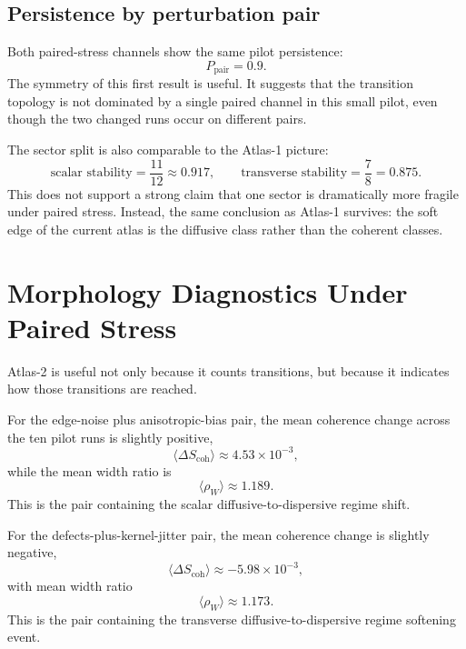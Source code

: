 \documentclass[11pt]{article}
\begin{document}
\subsection{Persistence by perturbation pair}
Both paired-stress channels show the same pilot persistence:
\begin{equation}
P_{\mathrm{pair}} = 0.9.
\end{equation}
The symmetry of this first result is useful. It suggests that the transition topology is not dominated by a single paired channel in this small pilot, even though the two changed runs occur on different pairs.

The sector split is also comparable to the Atlas-1 picture:
\begin{equation}
\text{scalar stability} = \frac{11}{12} \approx 0.917,
\qquad
\text{transverse stability} = \frac{7}{8} = 0.875.
\end{equation}
This does not support a strong claim that one sector is dramatically more fragile under paired stress. Instead, the same conclusion as Atlas-1 survives: the soft edge of the current atlas is the diffusive class rather than the coherent classes.

\section{Morphology Diagnostics Under Paired Stress}
Atlas-2 is useful not only because it counts transitions, but because it indicates how those transitions are reached.

For the edge-noise plus anisotropic-bias pair, the mean coherence change across the ten pilot runs is slightly positive,
\begin{equation}
\langle \Delta S_{\mathrm{coh}} \rangle \approx 4.53 \times 10^{-3},
\end{equation}
while the mean width ratio is
\begin{equation}
\langle \rho_W \rangle \approx 1.189.
\end{equation}
This is the pair containing the scalar diffusive-to-dispersive regime shift.

For the defects-plus-kernel-jitter pair, the mean coherence change is slightly negative,
\begin{equation}
\langle \Delta S_{\mathrm{coh}} \rangle \approx -5.98 \times 10^{-3},
\end{equation}
with mean width ratio
\begin{equation}
\langle \rho_W \rangle \approx 1.173.
\end{equation}
This is the pair containing the transverse diffusive-to-dispersive regime softening event.
\end{document}
